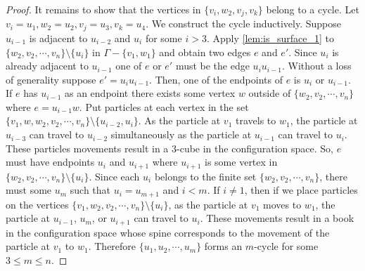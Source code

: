 \begin{proof}
    It remains to show that the vertices in \(\{v_i, w_2, v_j, v_k\}\) belong to a cycle.
    Let \(v_i = u_1, w_2 = u_2, v_j = u_3, v_k = u_4\).
    We construct the cycle inductively.
    Suppose \(u_{i - 1}\) is adjacent to \(u_{i - 2}\) and \(u_i\) for some \(i > 3\).
    Apply \ref{lem:is_surface_1} to \(\{w_2, v_2, \cdots, v_n\}\setminus\{u_i\}\) in \(\Gamma - \{v_1, w_1\}\) and obtain
    two edges \(e\) and \(e'\).
    Since \(u_i\) is already adjacent to \(u_{i-1}\) one of \(e\) or \(e'\) must
    be the edge \(u_i u_{i -1}\).
    Without a loss of generality suppose \(e' = u_i u_{i-1}\).
    Then, one of the endpoints of \(e\) is \(u_i\) or \(u_{i-1}\).
    If \(e\) has \(u_{i-1}\) as an endpoint there exists
    some vertex \(w\) outside of \(\{w_2, v_2, \cdots, v_n\}\) where \(e = u_{i-1} w\).
    Put particles at each vertex in the set \(\{v_1, w, w_2, v_2, \cdots, v_n\}\setminus\{u_{i-2}, u_i\}\).
    As the particle at \(v_1\) travels to \(w_1\),
    the particle at \(u_{i-3}\) can travel to \(u_{i-2}\) simultaneously as the particle
    at \(u_{i-1}\) can travel to \(u_i\).
    These particles movements result in a \(3\)-cube in the configuration space.
    So, \(e\) must have endpoints \(u_i\) and \(u_{i+1}\) where \(u_{i+1}\) is some vertex in \(\{w_2, v_2, \cdots, v_n\}\setminus\{u_i\}\).
    Since each \(u_i\) belongs to the finite set \(\{w_2, v_2, \cdots, v_n\}\),
    there must some \(u_m\) such that \(u_i = u_{m+1}\) and \(i < m\).
    If \(i \neq 1\), then if we place particles on the vertices
    \(\{v_1, w_2, v_2, \cdots, v_n\}\setminus \{u_i\}\), as the particle at \(v_1\) moves to \(w_1\),
    the particle at \(u_{i - 1}\), \(u_m\), or \(u_{i + 1}\) can travel to \(u_i\).
    These movements result in a book in the configuration space whose spine corresponds to the movement of the particle at \(v_1\) to \(w_1\).
    Therefore \(\{u_1, u_2, \cdots, u_m\}\) forms an \(m\)-cycle for some \(3 \le m \le n\).
\end{proof}

